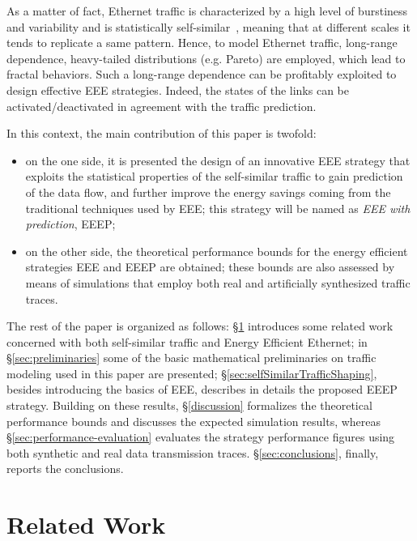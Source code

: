 \documentclass[journal,10pt,twoside,final]{IEEEtran}
\begin{document}
As a matter of fact, Ethernet traffic is characterized by a high level of burstiness and variability and is statistically self-similar~\cite{LelandTaqquWillinger94}, meaning that at different scales it tends to replicate a same pattern. 
Hence, to model Ethernet traffic, long-range dependence, heavy-tailed distributions (e.g. Pareto) are employed, which lead to fractal behaviors.
Such a long-range dependence can be profitably exploited to design effective EEE strategies. Indeed, the states of the links can be activated/deactivated in agreement with the traffic prediction. 

In this context, the main contribution of this paper is twofold:
\begin{itemize}
\item on the one side, it is presented the design of an innovative EEE strategy that exploits the statistical properties of the self-similar traffic to gain prediction of the data flow, and further improve the energy savings coming from the traditional techniques used by EEE; this strategy will be named as \emph{EEE with prediction}, EEEP;
\item on the other side, the theoretical performance bounds for the energy efficient strategies EEE and EEEP are obtained; these bounds are also assessed by means of simulations that employ both real and artificially synthesized traffic traces.
\end{itemize}

The rest of the paper is organized as follows: \S\ref{sec:relatedWork} introduces some related work concerned with both self-similar traffic and Energy Efficient Ethernet; in \S\ref{sec:preliminaries} some of the basic mathematical preliminaries on traffic modeling used in this paper are presented; \S\ref{sec:selfSimilarTrafficShaping}, besides introducing the basics of EEE, describes in details the proposed EEEP strategy. Building on these results, \S\ref{discussion} formalizes the theoretical performance bounds and discusses the expected simulation results, whereas \S\ref{sec:performance-evaluation} evaluates the strategy performance figures using both synthetic and real data transmission traces. \S\ref{sec:conclusions}, finally, reports the conclusions.


\section{Related Work}
\label{sec:relatedWork}
\end{document}
